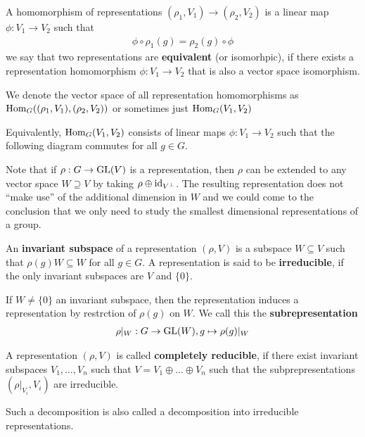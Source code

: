 \begin{dfn}[]
  A homomorphism of representations $(\rho_1,V_1) \to (\rho_2,V_2)$ is a linear map $\phi: V_1 \to V_2$ such that
  \begin{align*}
    \phi \circ \rho_1(g) = \rho_2(g) \circ\phi
  \end{align*}
  we say that two representations are \textbf{equivalent} (or isomorhpic), if there exists a representation homomorphism $\phi: V_1 \to  V_2$ that is also a vector space isomorphism.

  We denote the vector space of all representation homomorphisms as $\operatorname{Hom}_G((\rho_1,V_1),(\rho_2,V_2))$ or sometimes just $\operatorname{Hom}_G(V_1,V_2)$
\end{dfn}
Equivalently, $\operatorname{Hom}_G(V_1,V_2)$ consists of linear maps $\phi: V_1 \to  V_2$ such that the following diagram commutes for all $g \in G$.
\begin{center}
\end{center}

Note that if $\rho: G \to \operatorname{GL}(V)$ is a representation, then $\rho$ can be extended to any vector space $W \supseteq V$ by taking $\rho \oplus \operatorname{id}_{V^{\bot}}$.
The resulting representation does not ``make use'' of the additional dimension in $W$ and we could come to the conclusion that we only need to study the smallest dimensional representations of a group.
\begin{dfn}[]
  An \textbf{invariant subspace} of a representation $(\rho,V)$ is a subspace $W \subseteq V$ such that $\rho(g)W \subseteq W$ for all $g \in G$.
  A representation is said to be \textbf{irreducible}, if the only invariant subspaces are $V$ and $\{0\}$.

  If $W \neq \{0\}$ an invariant subspace, then the representation induces a representation by restrction of $\rho(g)$ on $W$.
  We call this the \textbf{subrepresentation}
  \begin{align*}
    \rho|_W : G \to \operatorname{GL}(W), g \mapsto \rho(g)|_W
  \end{align*}
\end{dfn}

\begin{dfn}[]
  A representation $(\rho,V)$ is called \textbf{completely reducible}, if there exist invariant subspaces $V_{1}, \ldots, V_{n}$ such that $V = V_1 \oplus \ldots \oplus V_n$ such that the subprepresentations $(\rho|_{V_i},V_i)$ are irreducible.
\end{dfn}
Such a decomposition is also called a decomposition into irreducible representations.


